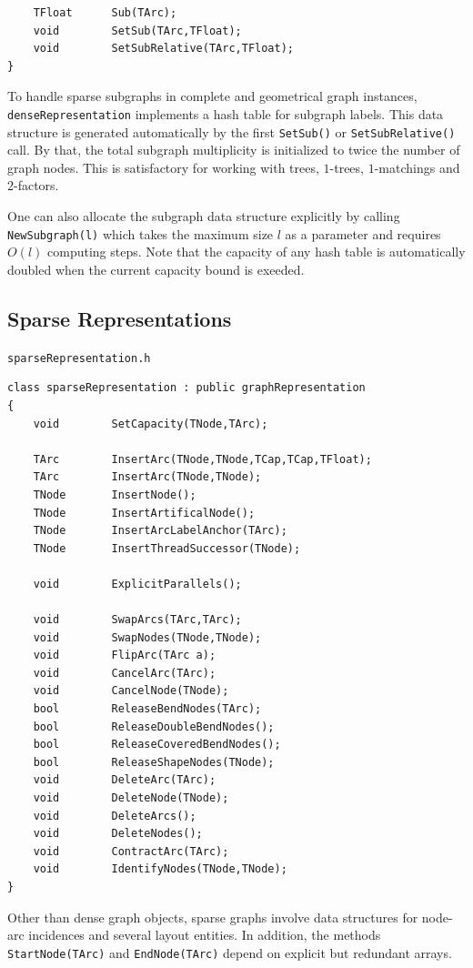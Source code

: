 \documentclass[a4paper,11pt,twoside]{book}
\begin{document}
\begin{multicols}{2}
\begin{mymethods}
\begin{verbatim}
    TFloat      Sub(TArc);
    void        SetSub(TArc,TFloat);
    void        SetSubRelative(TArc,TFloat);
}
\end{verbatim}
\end{mymethods}
To handle sparse subgraphs in complete and geometrical graph instances,
\verb/denseRepresentation/ implements a hash table for subgraph labels. This
data structure is generated automatically by the first \verb/SetSub()/ or
\verb/SetSubRelative()/ call. By that, the total subgraph multiplicity is
initialized to twice the number of graph nodes. This is satisfactory for
working with trees, $1$-trees, $1$-matchings and $2$-factors.

One can also allocate the subgraph data structure explicitly by calling
\verb/NewSubgraph(l)/ which takes the maximum size $l$ as a parameter
and requires $O(l)$ computing steps. Note that the capacity of any hash
table is automatically doubled when the current capacity bound is exeeded.


\subsection{Sparse Representations}
\label{slb_spsstruc}
\myinclude\verb/sparseRepresentation.h/
\begin{mymethods}
\begin{verbatim}
class sparseRepresentation : public graphRepresentation
{
    void        SetCapacity(TNode,TArc);

    TArc        InsertArc(TNode,TNode,TCap,TCap,TFloat);
    TArc        InsertArc(TNode,TNode);
    TNode       InsertNode();
    TNode       InsertArtificalNode();
    TNode       InsertArcLabelAnchor(TArc);
    TNode       InsertThreadSuccessor(TNode);

    void        ExplicitParallels();

    void        SwapArcs(TArc,TArc);
    void        SwapNodes(TNode,TNode);
    void        FlipArc(TArc a);
    void        CancelArc(TArc);
    void        CancelNode(TNode);
    bool        ReleaseBendNodes(TArc);
    bool        ReleaseDoubleBendNodes();
    bool        ReleaseCoveredBendNodes();
    bool        ReleaseShapeNodes(TNode);
    void        DeleteArc(TArc);
    void        DeleteNode(TNode);
    void        DeleteArcs();
    void        DeleteNodes();
    void        ContractArc(TArc);
    void        IdentifyNodes(TNode,TNode);
}
\end{verbatim}
\end{mymethods}
Other than dense graph objects, sparse graphs involve data structures
for node-arc incidences and several layout entities. In addition, the methods
\verb/StartNode(TArc)/ and \verb/EndNode(TArc)/ depend on explicit but redundant
arrays.


\end{multicols}
\end{document}
